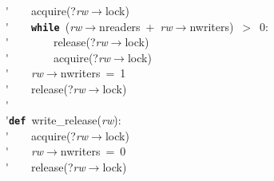 \'\>~~~~acquire(?\textit{rw}$\rightarrow$lock)\\

\'\>~~~~\texttt{\textbf{while}}~(\textit{rw}$\rightarrow$nreaders~+~\textit{rw}$\rightarrow$nwriters)~$>$~0:\\

\'\>~~~~~~~~release(?\textit{rw}$\rightarrow$lock)\\

\'\>~~~~~~~~acquire(?\textit{rw}$\rightarrow$lock)\\

\'\>~~~~\textit{rw}$\rightarrow$nwriters~=~1\\

\'\>~~~~release(?\textit{rw}$\rightarrow$lock)\\

\'\>\\

\'\>\texttt{\textbf{def}}~write\_release(\textit{rw}):\\

\'\>~~~~acquire(?\textit{rw}$\rightarrow$lock)\\

\'\>~~~~\textit{rw}$\rightarrow$nwriters~=~0\\

\'\>~~~~release(?\textit{rw}$\rightarrow$lock)